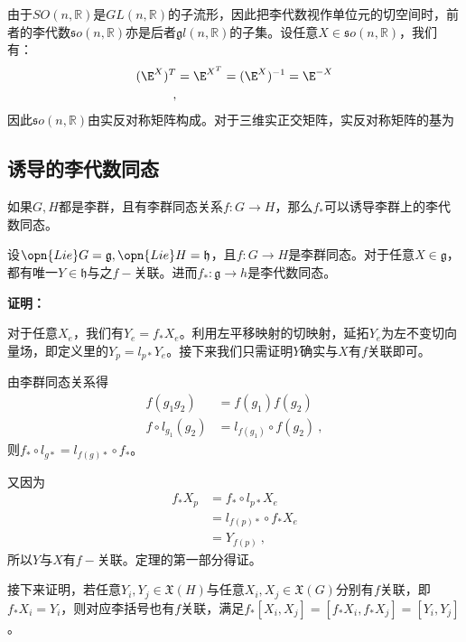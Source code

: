 由于$SO(n,\mathbb R)$是$GL(n,\mathbb R)$的子流形，因此把李代数视作单位元的切空间时，前者的李代数$\mathfrak so(n,\mathbb R)$亦是后者$\mathfrak gl(n,\mathbb R)$的子集。设任意$X\in \mathfrak so(n,\mathbb R)$，我们有：
\begin{equation}
\begin{aligned}
(\E^{X})^T&=\E^{X^T}=(\E^{X})^{-1}=\E^{-X}\\
~,
\end{aligned}
\end{equation}
因此$\mathfrak so(n,\mathbb R)$由实反对称矩阵构成。对于三维实正交矩阵，实反对称矩阵的基为



\subsection{诱导的李代数同态}
如果$G,H$都是李群，且有李群同态关系$f:G\to H$，那么$f_*$可以诱导李群上的李代数同态。
\begin{theorem}{}
设$\opn{Lie}G=\mathfrak g,\opn{Lie}H=\mathfrak h$，且$f:G\to H$是李群同态。对于任意$X\in \mathfrak g$，都有唯一$Y\in \mathfrak h$与之$f-$关联。进而$f_*:\mathfrak g\to h$是李代数同态。
\end{theorem}
\textbf{证明：}

对于任意$X_e$，我们有$Y_e=f_*X_e$。利用左平移映射的切映射，延拓$Y_e$为左不变切向量场，即定义里的$Y_p=l_{p*}Y_e$。接下来我们只需证明$Y$确实与$X$有$f$关联即可。

由李群同态关系得
\begin{equation}
\begin{aligned}
f(g_1g_2)&=f(g_1)f(g_2)\\
f\circ l_{g_1}(g_2)&=l_{f(g_1)}\circ f(g_2)~,
\end{aligned}
\end{equation}
则$f_*\circ l_{g*}=l_{f(g)*}\circ f_*$。

又因为
\begin{equation}
\begin{aligned}
f_*X_p&=f_*\circ l_{p*}X_e\\
&=l_{f(p)*}\circ f_*X_e\\
&=Y_{f(p)}~,
\end{aligned}
\end{equation}
所以$Y$与$X$有$f-$关联。定理的第一部分得证。

接下来证明，若任意$Y_i,Y_j\in \mathfrak{X}(H)$与任意$X_i,X_j\in \mathfrak{X}(G)$分别有$f$关联，即$f_*X_i=Y_i$，则对应李括号也有$f$关联，满足$f_*[X_i,X_j]=[f_*X_i,f_*X_j]=[Y_i,Y_j]$。

